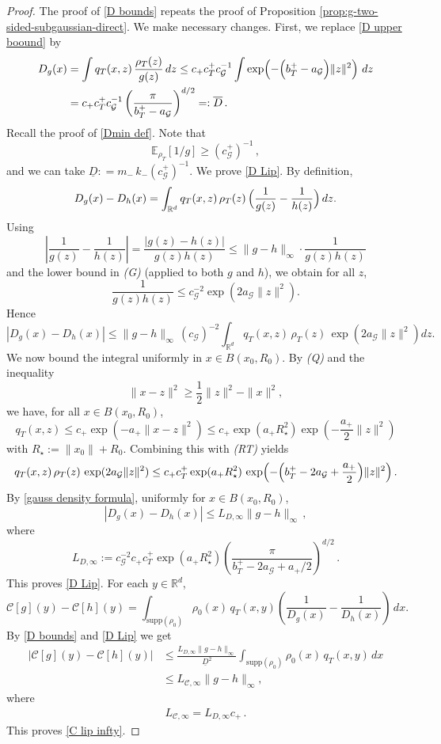 \documentclass[10pt,a4paper]{amsart}
\newcommand{\E}{\mathbb{E}}
\newcommand{\R}{\mathbb{R}}
\def\aGmin{a_{\mathcal{G}}}
\def\amax{a_{+}}
\def\bmax{b_T^{+}}
\def\cGmax{c_{\mathcal{G}}^{+}}
\def\cGmin{c_{\mathcal{G}}}
\def\cTmax{c_T^{+}}
\def\cmax{c_{+}}
\begin{document}
\begin{proof}
The proof of \eqref{D bounds} repeats the proof of Proposition \ref{prop:g-two-sided-subgaussian-direct}. We make necessary changes. First, we replace \eqref{D upper boound} by
\begin{align*}
  D_{g}(x)
  &=
  \int q_T(x,z)\,\frac{\rho_T(z)}{g(z)}\,dz
  \le
  \cmax \cTmax \cGmin^{-1}\int 
  \exp\!\left(-\Bigl(\bmax- \aGmin\Bigr)\|z\|^2\right)\,dz
  \\
  & =
  \cmax \cTmax  \cGmin^{-1} \left(\frac{\pi}{\bmax- \aGmin}\right)^{d/2} = : \overline{D}\, .
\end{align*}
Recall the proof of \eqref{Dmin def}. Note that
$$
\E_{\rho_T}[1/g] \geq (\cGmax)^{-1}\,, 
$$
and we can take $\underline{D}: = m_-\,k_- (\cGmax)^{-1}$. 
We prove \eqref{D Lip}. By definition,
\[
  D_g(x)-D_h(x)
  =
  \int_{\mathbb{R}^d} q_T(x,z)\,\rho_T(z)\,
  \Bigl(\frac{1}{g(z)}-\frac{1}{h(z)}\Bigr)\,dz.
\]
Using
\[
  \left|\frac{1}{g(z)}-\frac{1}{h(z)}\right|
  =
  \frac{|g(z)-h(z)|}{g(z)h(z)}
  \le
  \|g-h\|_\infty\cdot \frac{1}{g(z)h(z)}
\]
and the lower bound in \emph{(G)} (applied to both $g$ and $h$),
we obtain for all $z$,
\[
  \frac{1}{g(z)h(z)}
  \le
  \cGmin^{-2}\exp(2 \aGmin \|z\|^2).
\]
Hence
\begin{equation}\label{eq:Dg-Dh-basic}
  |D_g(x)-D_h(x)|
  \le
  \|g-h\|_\infty\,
  (\cGmin)^{-2}
  \int_{\mathbb{R}^d}
    q_T(x,z)\,\rho_T(z)\,\exp(2 \aGmin \|z\|^2) dz.
\end{equation}
We now bound the integral uniformly in $x\in B(x_0, R_0)$. By \emph{(Q)} and the inequality
\[
  \|x-z\|^2 \ge \frac{1}{2}\|z\|^2 - \|x\|^2,
\]
we have, for all $x\in B(x_0, R_0)$,
\[
  q_T(x,z)
  \le
  \cmax \exp(-\amax\|x-z\|^2)
  \le \cmax \exp(\amax R_\star^2)\exp\!\left(-\frac{\amax}{2}\|z\|^2\right)
\]
with $R_\star:=\|x_0\|+R_0.$
Combining this with \emph{(RT)} yields
\[
  q_T(x,z)\,\rho_T(z)\,\exp(2 \aGmin \|z\|^2)
  \le
  \cmax
  \cTmax \exp(\amax R_\star^2)\,
  \exp\!\left(-\Bigl(\bmax- 2 \aGmin +\frac{\amax}{2}\Bigr)\|z\|^2\right).
\]
By \eqref{gauss density formula}, uniformly for $x\in B(x_0, R_0)$,
\[
  |D_g(x)-D_h(x)|
  \le
  L_{D,\infty} \|g-h\|_\infty \, ,
\]
where 
\begin{equation}
\label{LD definition}
L_{D,\infty}
  :=
  \cGmin^{-2}
  \cmax
  \cTmax \exp(\amax R_\star^2) 
  \left(\frac{\pi}{\bmax- 2 \aGmin +\amax/2}\right)^{d/2}\, .
\end{equation}
This proves \eqref{D Lip}. For each $y \in \R^d$,
\[
  \mathcal C[g](y)-\mathcal C[h](y)
  =
  \int_{\mathrm{supp}(\rho_0)}\rho_0(x)\,q_T(x,y)
  \left(\frac{1}{D_g(x)}-\frac{1}{D_h(x)}\right)\,dx.
\]
By \eqref{D bounds} and \eqref{D Lip} we get 
\begin{align*}
  |\mathcal C[g](y)-\mathcal C[h](y)|
  & \le
  \frac{L_{D,\infty} \|g-h\|_\infty}{\underline D^2}
  \int_{\mathrm{supp}(\rho_0)}\rho_0(x)\,q_T(x,y)\,dx \\
  & \le L_{\mathcal C, \infty} \|g-h\|_\infty, 
\end{align*}
where 
\begin{eqnarray}
\label{CD definition}
    L_{\mathcal C, \infty} = L_{D,\infty} \cmax \, .
\end{eqnarray}
This proves \eqref{C lip infty}. 

\end{proof}
\end{document}
